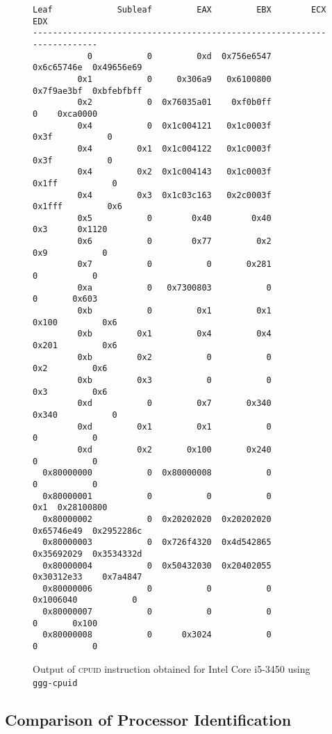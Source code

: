 \documentclass[a4paper,10pt,oneside,unicode]{article}
\newcommand{\cpuid}{\textsc{cpuid} }
\begin{document}
\begin{figure}[htbp]
\centering
\begin{verbatim}
Leaf             Subleaf         EAX         EBX        ECX          EDX
------------------------------------------------------------------------
           0           0         0xd  0x756e6547  0x6c65746e  0x49656e69
         0x1           0     0x306a9   0x6100800  0x7f9ae3bf  0xbfebfbff
         0x2           0  0x76035a01    0xf0b0ff           0    0xca0000
         0x4           0  0x1c004121   0x1c0003f        0x3f           0
         0x4         0x1  0x1c004122   0x1c0003f        0x3f           0
         0x4         0x2  0x1c004143   0x1c0003f       0x1ff           0
         0x4         0x3  0x1c03c163   0x2c0003f      0x1fff         0x6
         0x5           0        0x40        0x40         0x3      0x1120
         0x6           0        0x77         0x2         0x9           0
         0x7           0           0       0x281           0           0
         0xa           0   0x7300803           0           0       0x603
         0xb           0         0x1         0x1       0x100         0x6
         0xb         0x1         0x4         0x4       0x201         0x6
         0xb         0x2           0           0         0x2         0x6
         0xb         0x3           0           0         0x3         0x6
         0xd           0         0x7       0x340       0x340           0
         0xd         0x1         0x1           0           0           0
         0xd         0x2       0x100       0x240           0           0
  0x80000000           0  0x80000008           0           0           0
  0x80000001           0           0           0         0x1  0x28100800
  0x80000002           0  0x20202020  0x20202020  0x65746e49  0x2952286c
  0x80000003           0  0x726f4320  0x4d542865  0x35692029  0x3534332d
  0x80000004           0  0x50432030  0x20402055  0x30312e33    0x7a4847
  0x80000006           0           0           0   0x1006040           0
  0x80000007           0           0           0           0       0x100
  0x80000008           0      0x3024           0           0           0
\end{verbatim}

    \caption{Output of \cpuid instruction obtained for Intel\textregistered{} Core\texttrademark{} i5-3450 using \texttt{ggg-cpuid}~\cite{ggg-cpuid}}\label{fig:x86-cpuid}
\end{figure}

\subsection{Comparison of Processor Identification}
\end{document}
